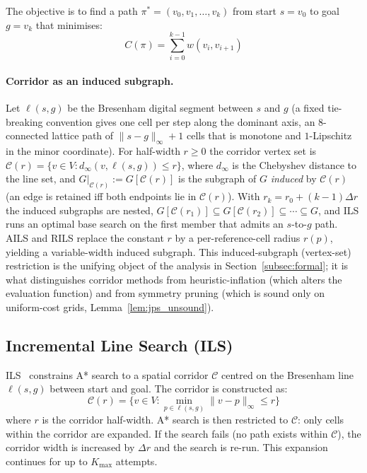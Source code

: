 \documentclass[preprint,12pt,authoryear]{elsarticle}
\begin{document}
The objective is to find a path $\pi^* = (v_0, v_1, \ldots, v_k)$ from start $s = v_0$ to goal $g = v_k$ that minimises:
\begin{equation}\label{eq:objective}
    C(\pi) = \sum_{i=0}^{k-1} w(v_i, v_{i+1})
\end{equation}

\paragraph{Corridor as an induced subgraph.}
Let $\ell(s,g)$ be the Bresenham digital segment between $s$ and $g$ (a fixed tie-breaking convention gives one cell per step along the dominant axis, an $8$-connected lattice path of $\|s-g\|_\infty + 1$ cells that is monotone and $1$-Lipschitz in the minor coordinate). For half-width $r \geq 0$ the corridor vertex set is $\mathcal{C}(r) = \{v \in V : d_\infty(v, \ell(s,g)) \leq r\}$, where $d_\infty$ is the Chebyshev distance to the line set, and $G|_{\mathcal{C}(r)} := G[\mathcal{C}(r)]$ is the subgraph of $G$ \emph{induced} by $\mathcal{C}(r)$ (an edge is retained iff both endpoints lie in $\mathcal{C}(r)$). With $r_k = r_0 + (k-1)\Delta r$ the induced subgraphs are nested, $G[\mathcal{C}(r_1)] \subseteq G[\mathcal{C}(r_2)] \subseteq \cdots \subseteq G$, and ILS runs an optimal base search on the first member that admits an $s$-to-$g$ path. AILS and RILS replace the constant $r$ by a per-reference-cell radius $r(p)$, yielding a variable-width induced subgraph. This induced-subgraph (vertex-set) restriction is the unifying object of the analysis in Section~\ref{subsec:formal}; it is what distinguishes corridor methods from heuristic-inflation (which alters the evaluation function) and from symmetry pruning (which is sound only on uniform-cost grids, Lemma~\ref{lem:jps_unsound}).

\subsection{Incremental Line Search (ILS)}

ILS~\citep{Elshahed2025ILS} constrains A* search to a spatial corridor $\mathcal{C}$ centred on the Bresenham line $\ell(s, g)$ between start and goal.
The corridor is constructed as:
\begin{equation}\label{eq:corridor}
    \mathcal{C}(r) = \{v \in V : \min_{p \in \ell(s,g)} \|v - p\|_\infty \leq r\}
\end{equation}
where $r$ is the corridor half-width.
A* search is then restricted to $\mathcal{C}$: only cells within the corridor are expanded.
If the search fails (no path exists within $\mathcal{C}$), the corridor width is increased by $\Delta r$ and the search is re-run.
This expansion continues for up to $K_{\max}$ attempts.
\end{document}
